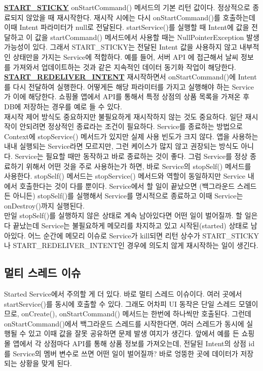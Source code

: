 \underline{\bfseries START\_STICKY} onStartCommand() 메서드의 기본 리턴 값이다. 정상적으로 종료되지 않았을 때 재시작한다. 
재시작 시에는 다시 onStartCommand()를 호출하는데 이때 Intent 파라미터가 null로 전달된다.
startService()를 실행할 때 Intent에 값을 전달하고 이 값을 startCommand() 메서드에서 사용할 때는 NullPointerException 발생 가능성이 있다. 
그래서 START\_STICKY는 전달된 Intent 값을 사용하지 않고 내부적인 상태만을 가지는 Service에 적합하다.
예를 들어, 서버 API 에 접근해서 날씨 정보를 가져와서 업데이트하는 것과 같은 지속적인 데이터 동기화 작업이 해당한다.\\

\underline{\bfseries START\_REDELIVER\_INTENT} 재시작하면서 onStartCommand()에 Intent를 다시 전달하여 실행한다. 어떻게든 해당 파라미터를 가지고 실행해야 하는 Service가 이에 해당한다. 쇼핑몰 앱에서 API를 통해서 특정 상점의 상품 목록을 가져온 후 DB에 저장하는 경우를 예로 들 수 있다.\\

재시작 제어 방식도 중요하지만 불필요하게 재시작하지 않는 것도 중요하다. 
일단 재시작이 안되려면 정상적인 종료라는 조건이 필요하다. 
Service를 종료하는 방법으로 Context에 stopService() 메서드가 있지만 실제 사용 빈도가 크지 않다. 
앱을 사용하는 내내 실행되는 Service라면 모르지만, 그런 케이스가 많지 않고 권장되는 방식도 아니다. 
Service는 필요할 때만 동작하고 바로 종료하는 것이 좋다.
그럼 Service를 정상 종료하기 위해서 어떤 것을 주로 사용하는가 하면, 바로 Service의 stopSelf() 메서드를 사용한다. 
stopSelf() 메서드는 stopService() 메서드와 역할이 동일하지만 Service 내에서 호출한다는 것이 다를 뿐이다. 
Service에서 할 일이 끝났으면 (백그라운드 스레드든 아니든) stopSelf()를 실행해서 Service를 명시적으로 종료하고 이때 Service는 onDestroy()까지 실행된다.\\

만일 stopSelf()를 실행하지 않은 상태로 계속 남아있다면 어떤 일이 벌어질까. 할 일은 다 끝났는데 Service는 불필요하게 메모리를 차지하고 있고 시작된(started) 상태로 남아있다. 
어느 순간에 메모리 이슈로 Service가 kill되면 리턴 상수가 START\_STICKY나 START\_REDELIVER\_INTENT인 경우에 의도치 않게 재시작하는 일이 생긴다.

\subsection{멀티 스레드 이슈}
Started Service에서 주의할 게 더 있다. 바로 멀티 스레드 이슈이다. 여러 곳에서 startService()를 동시에 호출할 수 있다. 
그래도 어차피 UI 동작은 단일 스레드 모델이므로, onCreate(), onStartCommand() 메서드는 한번에 하나씩만 호출된다.
그런데 onStartCommand()에서 백그라운드 스레드를 시작한다면, 여러 스레드가 동시에 실행될 수 있고 이때 값을 잘못 공유하면 문제 발생 여지가 생긴다. 
앞에서 예를 든 쇼핑몰 앱에서 각 상점마다 API를 통해 상품 정보를 가져오는데, 전달된 Intent의 상점 id를 Service의 멤버 변수로 쓰면 어떤 일이 벌어질까? 
바로 엉뚱한 곳에 데이터가 저장되는 상황을 맞게 된다.\\

